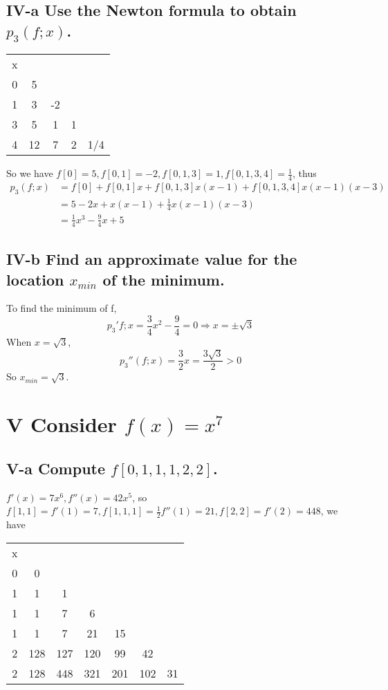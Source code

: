 \documentclass[twoside,a4paper]{article}
\begin{document}
\subsection*{IV-a \small{Use the Newton formula to obtain $p_{3}\left( f;x \right) $.}}

\begin{tabular}{c|cccc}
x\\
0&5\\
1&3 &-2\\
3&5 &1 &1\\
4&12&7 &2&1/4\\
\end{tabular}

So we have $f[0]=5,f[0,1]=-2,f[0,1,3]=1,f[0,1,3,4]=\frac{1}{4}$, thus
\begin{equation*}
\begin{split}
	p_{3}\left( f;x \right)&=f[0]+f[0,1]x+f[0,1,3]x\left( x-1 \right)+f[0,1,3,4]x\left( x-1 \right)\left( x-3 \right)\\
			       &=5-2x+x\left( x-1 \right)+\frac{1}{4}x\left( x-1 \right)\left( x-3 \right)\\
			       &=\frac{1}{4}x^{3}-\frac{9}{4}x+5
\end{split}
\end{equation*}

\subsection*{IV-b \small{Find an approximate value for the location $x_{min}$ of the minimum.}}

To find the minimum of f,
$$p_{3}'{f;x}=\frac{3}{4}x^{2}-\frac{9}{4}=0 \Rightarrow x=\pm \sqrt{3} $$
When $x=\sqrt{3} $,
$$p_{3}''\left( f;x \right)=\frac{3}{2}x=\frac{3\sqrt{3} }{2}>0 $$
So $x_{min}=\sqrt{3} $. 

\section*{V \small{Consider $f\left( x \right)=x^{7} $}}

\subsection*{V-a \small{Compute $f[0,1,1,1,2,2]$.}}

$f'\left(  x\right)=7x^{6},f''\left( x \right)=42x^{5}  $, so $f[1,1]=f'\left( 1 \right)=7
,f[1,1,1]=\frac{1}{2}f''\left( 1 \right)=21,f[2,2]=f'\left( 2 \right)=448   $, we have
\begin{tabular}{c|cccccc}
x\\
0 &0\\
1 &1  &1\\
1 &1  &7  &6\\
1 &1  &7  &21 &15\\
2 &128&127&120&99 &42\\
2 &128&448&321&201&102&31\\
\end{tabular}
\end{document}

